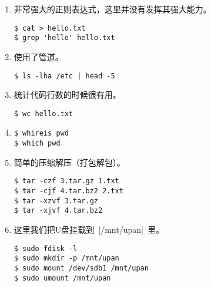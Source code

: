 \documentclass[cs4size,a4paper,nofonts]{ctexart}
\begin{document}
\begin{enumerate}

\item 非常强大的正则表达式，这里并没有发挥其强大能力。
\begin{Verbatim}
$ cat > hello.txt
$ grep 'hello' hello.txt
\end{Verbatim}

\begin{figure}[htp]
\end{figure}

\item 使用了管道。
\begin{Verbatim}
$ ls -lha /etc | head -5
\end{Verbatim}

\begin{figure}[htp]
\end{figure}

\item 统计代码行数的时候很有用。
\begin{Verbatim}
$ wc hello.txt
\end{Verbatim}

\begin{figure}[htp]
\end{figure}

\item \begin{Verbatim}
$ whireis pwd
$ which pwd
\end{Verbatim}

\begin{figure}[htp]
\end{figure}

\item 简单的压缩解压（打包解包）。
\begin{Verbatim}
$ tar -czf 3.tar.gz 1.txt
$ tar -cjf 4.tar.bz2 2.txt
$ tar -xzvf 3.tar.gz
$ tar -xjvf 4.tar.bz2
\end{Verbatim}

\begin{figure}[htp]
\end{figure}

\item 这里我们把U盘挂载到~|/mnt/upan|~里。
\begin{Verbatim}
$ sudo fdisk -l
$ sudo mkdir -p /mnt/upan
$ sudo mount /dev/sdb1 /mnt/upan
$ sudo umount /mnt/upan
\end{Verbatim}


\end{enumerate}
\end{document}
